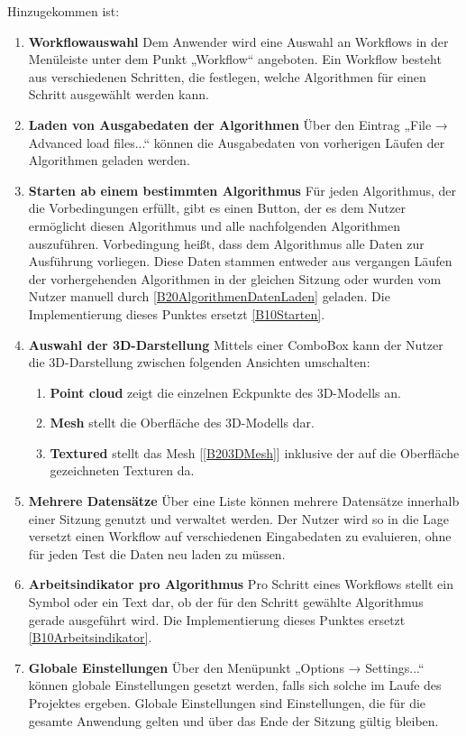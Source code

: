 Hinzugekommen ist:
\begin{enumerate}[ align=left, label={\textbf{\textbackslash B20\arabic*0\textbackslash}}]
	\item \textbf{Workflowauswahl} Dem Anwender wird eine Auswahl an Workflows in der Menüleiste unter dem Punkt „Workflow“ angeboten. Ein Workflow besteht aus verschiedenen Schritten, die festlegen, welche Algorithmen für einen Schritt ausgewählt werden kann.
	\item \textbf{Laden von Ausgabedaten der Algorithmen} \label{B20AlgorithmenDatenLaden} Über den Eintrag „File → Advanced load files...“ können die Ausgabedaten von vorherigen Läufen der Algorithmen geladen werden.
	\item \textbf{Starten ab einem bestimmten Algorithmus} Für jeden Algorithmus, der die Vorbedingungen erfüllt, gibt es einen Button, der es dem Nutzer ermöglicht diesen Algorithmus und alle nachfolgenden Algorithmen auszuführen. Vorbedingung heißt, dass dem Algorithmus alle Daten zur Ausführung vorliegen. Diese Daten stammen entweder aus vergangen Läufen der vorhergehenden Algorithmen in der gleichen Sitzung oder wurden vom Nutzer manuell durch \ref{B20AlgorithmenDatenLaden} geladen. Die Implementierung dieses Punktes ersetzt \ref{B10Starten}.
	\item \textbf{Auswahl der 3D-Darstellung} Mittels einer ComboBox kann der Nutzer die 3D-Darstellung zwischen folgenden Ansichten umschalten:
		\begin{enumerate}[ label={\textbf{\alph*}}, ref={\textbf{\textbackslash B20\arabic{enumi}0\textbackslash\alph*}} ]
			\item \textbf{Point cloud} zeigt die einzelnen Eckpunkte des 3D-Modells an.
			\item \textbf{Mesh} \label{B203DMesh} stellt die Oberfläche des 3D-Modells dar.
			\item \textbf{Textured} stellt das Mesh [\ref{B203DMesh}] inklusive der auf die Oberfläche gezeichneten Texturen da.
		\end{enumerate}
	\item \textbf{Mehrere Datensätze} Über eine Liste können mehrere Datensätze innerhalb einer Sitzung genutzt und verwaltet werden. Der Nutzer wird so in die Lage versetzt einen Workflow auf verschiedenen Eingabedaten zu evaluieren, ohne für jeden Test die Daten neu laden zu müssen.
	\item \textbf{Arbeitsindikator pro Algorithmus} Pro Schritt eines Workflows stellt ein Symbol oder ein Text dar, ob der für den Schritt gewählte Algorithmus gerade ausgeführt wird. Die Implementierung dieses Punktes ersetzt \ref{B10Arbeitsindikator}.
	\item \textbf{Globale Einstellungen} Über den Menüpunkt „Options → Settings...“ können globale Einstellungen gesetzt werden, falls sich solche im Laufe des Projektes ergeben. Globale Einstellungen sind Einstellungen, die für die gesamte Anwendung gelten und über das Ende der Sitzung gültig bleiben.
\end{enumerate}